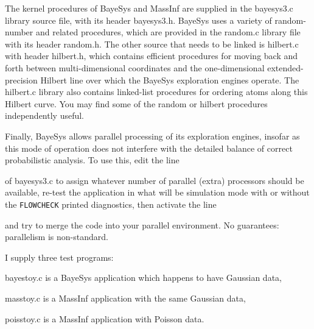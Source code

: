 \vfill\eject
{}
\bigskip

The kernel procedures of BayeSys and MassInf are supplied in the bayesys3.c library source file, with its header bayesys3.h.
BayeSys uses a variety of random-number and related procedures, which are provided in the random.c library file with its header random.h.  
The other source that needs to be linked is hilbert.c with header hilbert.h, 
which contains efficient procedures for moving back and forth between multi-dimensional coordinates 
and the one-dimensional extended-precision Hilbert line over which the BayeSys exploration engines operate.  
The hilbert.c library also contains linked-list procedures for ordering atoms along this Hilbert curve.
You may find some of the random or hilbert procedures independently useful.

Finally, BayeSys allows parallel processing of its exploration engines, 
insofar as this mode of operation does not interfere with the detailed balance of correct probabilistic analysis.  
To use this, edit the line

\indent{}

\noindent of bayesys3.c to assign whatever number of parallel (extra) processors should be available, 
re-test the application in what will be simulation mode with or without the {\tt FLOWCHECK} printed diagnostics, then activate the line

\indent{}

\noindent and try to merge the code into your parallel environment. No guarantees: parallelism is non-standard.

I supply three test programs:

\indent\qquad\quad    bayestoy.c is a BayeSys application which happens to have Gaussian data,

\indent\qquad\quad    masstoy.c  is a MassInf application with the same Gaussian data,

\indent\qquad\quad    poisstoy.c is a MassInf application with Poisson data.

